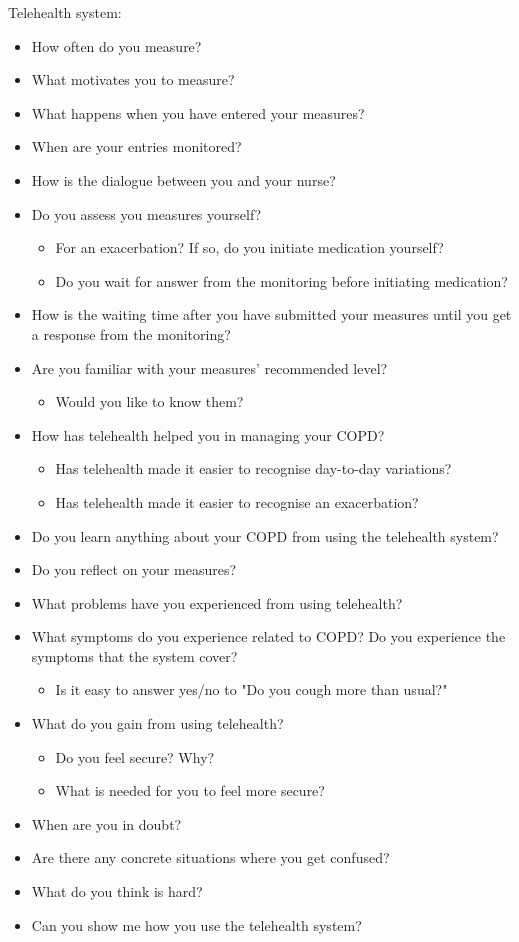 Telehealth system:
\begin{itemize}
	\item How often do you measure?
	\item What motivates you to measure?
	\item What happens when you have entered your measures?
	\item When are your entries monitored?
	\item How is the dialogue between you and your nurse?
	\item Do you assess you measures yourself?
	\begin{itemize}
		\item For an exacerbation? If so, do you initiate medication yourself?
		\item Do you wait for answer from the monitoring before initiating medication?
	\end{itemize}
	\item How is the waiting time after you have submitted your measures until you get a response from the monitoring?
	\item Are you familiar with your measures' recommended level?
	\begin{itemize}
		\item Would you like to know them?
	\end{itemize}
	\item How has telehealth helped you in managing your COPD?
	\begin{itemize}
		\item Has telehealth made it easier to recognise day-to-day variations?
		\item Has telehealth made it easier to recognise an exacerbation?
	\end{itemize}
	\item Do you learn anything about your COPD from using the telehealth system?
	\item Do you reflect on your measures?
	\item What problems have you experienced from using telehealth?
	\item What symptoms do you experience related to COPD? Do you experience the symptoms that the system cover?
	\begin{itemize}
		\item Is it easy to answer yes/no to "Do you cough more than usual?"
	\end{itemize}
	\item What do you gain from using telehealth?
	\begin{itemize}
		\item Do you feel secure? Why?
		\item What is needed for you to feel more secure?
	\end{itemize}
	\item When are you in doubt?
	\item Are there any concrete situations where you get confused?
	\item What do you think is hard?
	\item Can you show me how you use the telehealth system?
\end{itemize}



